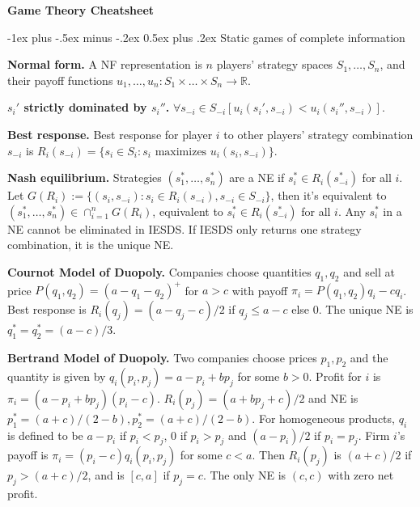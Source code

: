 \documentclass[a4paper,11pt,landscape]{article}
\makeatletter
\renewcommand{\section}{\@startsection{section}{1}{0mm}%
                                {-1ex plus -.5ex minus -.2ex}%
                                {0.5ex plus .2ex}%
                                {\normalfont\large\bfseries}}
\makeatother
\begin{document}
\raggedright
\footnotesize

\begin{center}
     \Large{\textbf{Game Theory Cheatsheet}} \\
\end{center}
\begin{multicols*}{3}
\setlength{\premulticols}{1pt}
\setlength{\postmulticols}{1pt}
\setlength{\multicolsep}{1pt}
\setlength{\columnsep}{2pt}
\section{Static games of complete information}

\textbf{Normal form.} A NF representation is $n$ players' strategy spaces $S_1,\ldots,S_n$, and their payoff functions $u_1,\ldots,u_n: S_1\times \ldots\times S_n\to \mathbb{R}$.

\textbf{$s_i'$ strictly dominated by $s_i''$.} $\forall s_{-i}\in S_{-i}[u_i(s_i',s_{-i})<u_i(s_i'',s_{-i})]$.

\textbf{Best response.} Best response for player $i$ to other players' strategy combination $s_{-i}$ is $R_i(s_{-i})=\{s_i\in S_i:s_i\text{ maximizes }u_i(s_i,s_{-i})\}$.

\textbf{Nash equilibrium.} Strategies $(s_1^*,\ldots,s_n^*)$ are a NE if $s_i^*\in R_i(s_{-i}^*)$ for all $i$. Let $G(R_i):=\{(s_i,s_{-i}):s_i\in R_i(s_{-i}),s_{-i}\in S_{-i}\}$, then it's equivalent to $(s_1^*,\ldots,s_n^*)\in \cap_{i=1}^nG(R_i)$, equivalent to $s_i^*\in R_i(s_{-i}^*)$ for all $i$. Any $s_i^*$ in a NE cannot be eliminated in IESDS. If IESDS only returns one strategy combination, it is the unique NE.

\textbf{Cournot Model of Duopoly.} Companies choose quantities $q_1,q_2$ and sell at price $P(q_1,q_2)=(a-q_1-q_2)^+$ for $a>c$ with payoff $\pi_i=P(q_1,q_2)q_i-cq_i$. Best response is $R_i(q_j)=(a-q_j-c)/2$ if $q_j\leq a-c$ else $0$. The unique NE is $q_1^*=q_2^*=(a-c)/3$.

\textbf{Bertrand Model of Duopoly.} Two companies choose prices $p_1,p_2$ and the quantity is given by $q_i(p_i,p_j)=a-p_i+bp_j$ for some $b>0$. Profit for $i$ is $\pi_i=(a-p_i+bp_j)(p_i-c)$. $R_i(p_j)=(a+bp_j+c)/2$ and NE is $p_1^*=(a+c)/(2-b),p_2^*=(a+c)/(2-b)$. For homogeneous products, $q_i$ is defined to be $a-p_i$ if $p_i<p_j$, $0$ if $p_i>p_j$ and $(a-p_i)/2$ if $p_i=p_j$. Firm $i$'s payoff is $\pi_i=(p_i-c)q_i(p_i,p_j)$ for some $c<a$. Then $R_i(p_j)$ is $(a+c)/2$ if $p_j>(a+c)/2$, and is $[c,a]$ if $p_j=c$. The only NE is $(c,c)$ with zero net profit.


\end{multicols*}
\end{document}

